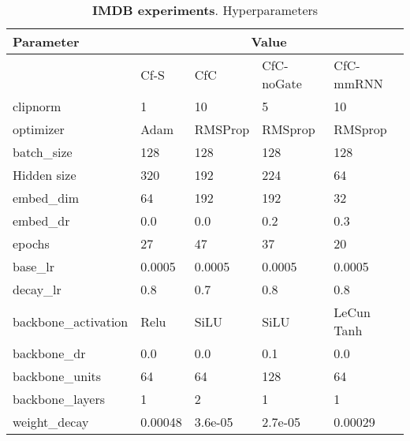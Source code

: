 \documentclass[12pt]{article}
\begin{document}
\begin{table}[t]
    \centering
    \caption{\textbf{IMDB experiments}. Hyperparameters}
\begin{tabular}{lllll}
\toprule
Parameter & \multicolumn{4}{c}{Value}  \\
\midrule
{} & Cf-S & CfC & CfC-noGate & CfC-mmRNN \\
\midrule
clipnorm & 1 & 10 & 5 & 10 \\ 
optimizer & Adam & RMSProp & RMSprop & RMSprop \\
batch\_size & 128 & 128 & 128 & 128\\
Hidden size & 320 & 192 & 224 & 64 \\
   embed\_dim & 64 & 192 & 192 & 32 \\
   embed\_dr & 0.0 & 0.0 & 0.2 & 0.3 \\
   epochs & 27 & 47 & 37 & 20 \\ 
   base\_lr & 0.0005 & 0.0005 & 0.0005 & 0.0005\\
   decay\_lr & 0.8 & 0.7 & 0.8 & 0.8 \\ 
   backbone\_activation & Relu & SiLU & SiLU & LeCun Tanh \\ 
   backbone\_dr & 0.0 & 0.0 & 0.1 & 0.0 \\
   backbone\_units & 64 & 64 & 128 & 64 \\
   backbone\_layers & 1 & 2 & 1 & 1 \\
   weight\_decay & 0.00048 & 3.6e-05 & 2.7e-05 & 0.00029 \\ 
\bottomrule
\end{tabular}
    \label{tab:hyperparamsimdb}
\end{table}
\end{document}
